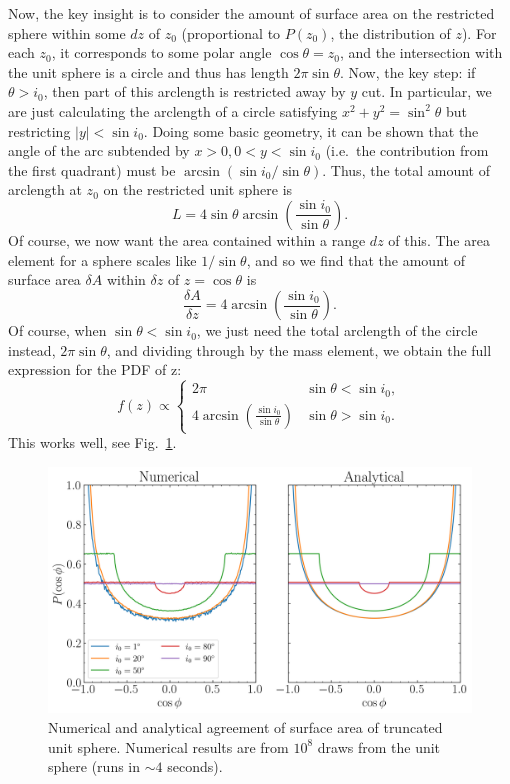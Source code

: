 \documentclass[12pt]{article}
\newcommand*{\abs}[1]{\left|#1\right|}
\newcommand*{\p}[1]{\left(#1\right)}
\begin{document}
Now, the key insight is to consider the amount of surface area on the restricted
sphere within some $dz$ of $z_0$ (proportional to $P(z_0)$, the distribution of
$z$). For each $z_0$, it corresponds to some polar angle $\cos \theta = z_0$,
and the intersection with the unit sphere is a circle and thus has length $2\pi
\sin \theta$. Now, the key step: if $\theta > i_0$, then part of this arclength
is restricted away by $y$ cut. In particular, we are just calculating the
arclength of a circle satisfying $x^2 + y^2 = \sin^2\theta$ but restricting
$\abs{y} < \sin i_0$. Doing some basic geometry, it can be shown that the angle
of the arc subtended by $x > 0, 0 < y < \sin i_0$ (i.e.\ the contribution from
the first quadrant) must be $\arcsin(\sin i_0 / \sin \theta)$. Thus, the total
amount of arclength at $z_0$ on the restricted unit sphere is
\begin{equation}
    L = 4\sin\theta \arcsin\p{\frac{\sin i_0}{\sin \theta}}.
\end{equation}
Of course, we now want the area contained within a range $dz$ of this. The area
element for a sphere scales like $1 / \sin\theta$, and so we find that the
amount of surface area $\delta A$ within $\delta z$ of $z = \cos \theta$ is
\begin{equation}
    \frac{\delta A}{\delta z}
        = 4 \arcsin\p{\frac{\sin i_0}{\sin\theta}}.
\end{equation}
Of course, when $\sin\theta < \sin i_0$, we just need the total arclength of the
circle instead, $2\pi \sin \theta$, and dividing through by the mass element, we
obtain the full expression for the PDF of z:
\begin{equation}
    f(z) \propto
        \begin{cases}
            2\pi & \sin \theta < \sin i_0,\\
            4 \arcsin\p{\frac{\sin i_0}{\sin\theta}}
                & \sin\theta > \sin i_0.
        \end{cases}
\end{equation}
This works well, see Fig.~\ref{fig:sample_on_sphere}.
\begin{figure}
    \centering
    \includegraphics[width=0.7\columnwidth]{research_misc/sample_on_sphere.png}
    \caption{Numerical and analytical agreement of surface area of truncated
    unit sphere. Numerical results are from $10^8$ draws from the unit sphere
    (runs in $\sim 4$ seconds).}\label{fig:sample_on_sphere}
\end{figure}
\end{document}
